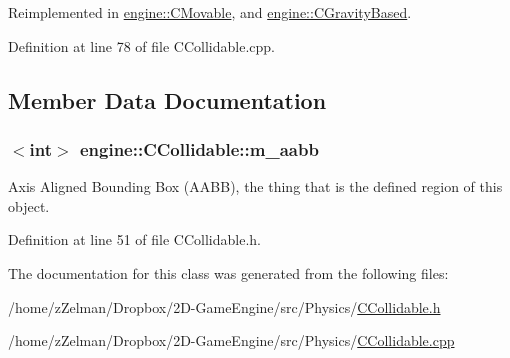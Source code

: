 Reimplemented in \hyperlink{classengine_1_1CMovable_a18299a0373464c4e1aadcdc9824eed9a}{engine\-::\-C\-Movable}, and \hyperlink{classengine_1_1CGravityBased_a1fd898d6529eeb9bb8651d7d9bcdb89c}{engine\-::\-C\-Gravity\-Based}.



Definition at line 78 of file C\-Collidable.\-cpp.



\subsection{Member Data Documentation}
\hypertarget{classengine_1_1CCollidable_aca283a2f940e99dcd6b0f57e7812968d}{
\subsubsection[{m\-\_\-aabb}]{$<$int$>$ engine\-::\-C\-Collidable\-::m\-\_\-aabb\hspace{0.3cm}{\ttfamily [protected]}}}\label{classengine_1_1CCollidable_aca283a2f940e99dcd6b0f57e7812968d}


Axis Aligned Bounding Box (A\-A\-B\-B), the thing that is the defined region of this object. 



Definition at line 51 of file C\-Collidable.\-h.



The documentation for this class was generated from the following files\-:\begin{DoxyCompactItemize}
\item 
/home/z\-Zelman/\-Dropbox/2\-D-\/\-Game\-Engine/src/\-Physics/\hyperlink{CCollidable_8h}{C\-Collidable.\-h}\item 
/home/z\-Zelman/\-Dropbox/2\-D-\/\-Game\-Engine/src/\-Physics/\hyperlink{CCollidable_8cpp}{C\-Collidable.\-cpp}\end{DoxyCompactItemize}

